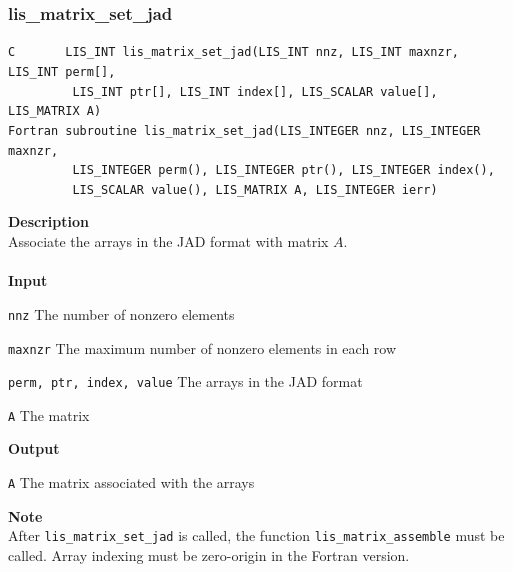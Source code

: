\documentclass[a4paper]{article}
\newcommand{\namelistlabel}[1]{\mbox{#1}\hfill}
\newenvironment{namelist}[1]{%
\begin{list}{}
  {\let\makelabel\namelistlabel
  \settowidth{\labelwidth}{#1}
  \setlength{\leftmargin}{1.1\labelwidth}}
  }{%
\end{list}}
\begin{document}
\subsubsection{lis\_matrix\_set\_jad}
\begin{screen}
\verb|C       LIS_INT lis_matrix_set_jad(LIS_INT nnz, LIS_INT maxnzr, LIS_INT perm[],|\\
\verb|         LIS_INT ptr[], LIS_INT index[], LIS_SCALAR value[], LIS_MATRIX A)|\\
\verb|Fortran subroutine lis_matrix_set_jad(LIS_INTEGER nnz, LIS_INTEGER maxnzr,|\\
\verb|         LIS_INTEGER perm(), LIS_INTEGER ptr(), LIS_INTEGER index(),|\\
\verb|         LIS_SCALAR value(), LIS_MATRIX A, LIS_INTEGER ierr)|
\end{screen}
{\bf Description}\\
\indent
Associate the arrays in the JAD format with matrix $A$.
\\ \\
\noindent
{\bf Input}
\begin{namelist}{XXXXXXXXXXXXXXXXXXXX}
\item[\tt nnz] The number of nonzero elements
\item[\tt maxnzr] The maximum number of nonzero elements in each row
\item[\tt perm, ptr, index, value] The arrays in the JAD format
\item[\tt A] The matrix
\end{namelist}
{\bf Output}
\begin{namelist}{XXXXXXXXXXXXXXXXXXXX}
\item[\tt A] The matrix associated with the arrays
\end{namelist}
\noindent
{\bf Note}\\
\indent
After \verb|lis_matrix_set_jad| is called, 
the function \verb|lis_matrix_assemble| must be called. 
Array indexing must be zero-origin in the Fortran version.
\end{document}
